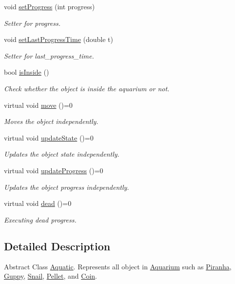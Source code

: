 \begin{DoxyCompactItemize}
void \mbox{\hyperlink{class_aquatic_a56bd74d0814dd9ed13b395c0033eb594}{set\+Progress}} (int progress)
\begin{DoxyCompactList}\small\item\em Setter for progress. \end{DoxyCompactList}\item 
void \mbox{\hyperlink{class_aquatic_a50e51e4b7bfd7f46d3c43bde27e0a5d8}{set\+Last\+Progress\+Time}} (double t)
\begin{DoxyCompactList}\small\item\em Setter for last\+\_\+progress\+\_\+time. \end{DoxyCompactList}\item 
bool \mbox{\hyperlink{class_aquatic_a2c438132d8b625d3c2187ff5735193a0}{is\+Inside}} ()
\begin{DoxyCompactList}\small\item\em Check whether the object is inside the aquarium or not. \end{DoxyCompactList}\item 
virtual void \mbox{\hyperlink{class_aquatic_a962e93c804814eeaf3cea6e26698eef7}{move}} ()=0
\begin{DoxyCompactList}\small\item\em Moves the object independently. \end{DoxyCompactList}\item 
virtual void \mbox{\hyperlink{class_aquatic_a51e44c95476d72a841fea667c6cbbedc}{update\+State}} ()=0
\begin{DoxyCompactList}\small\item\em Updates the object state independently. \end{DoxyCompactList}\item 
virtual void \mbox{\hyperlink{class_aquatic_ae1b6301ed27d6aadb73c7ee7879c24af}{update\+Progress}} ()=0
\begin{DoxyCompactList}\small\item\em Updates the object progress independently. \end{DoxyCompactList}\item 
virtual void \mbox{\hyperlink{class_aquatic_a22fdb11e9cfec922fe50638709768276}{dead}} ()=0
\begin{DoxyCompactList}\small\item\em Executing dead progress. \end{DoxyCompactList}\end{DoxyCompactItemize}


\subsection{Detailed Description}
Abstract Class \mbox{\hyperlink{class_aquatic}{Aquatic}}. Represents all object in \mbox{\hyperlink{class_aquarium}{Aquarium}} such as \mbox{\hyperlink{class_piranha}{Piranha}}, \mbox{\hyperlink{class_guppy}{Guppy}}, \mbox{\hyperlink{class_snail}{Snail}}, \mbox{\hyperlink{class_pellet}{Pellet}}, and \mbox{\hyperlink{class_coin}{Coin}}. 

